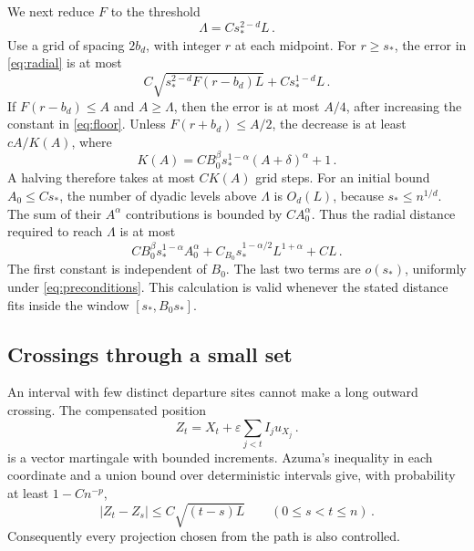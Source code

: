 \documentclass[11pt]{amsart}
\theoremstyle{plain}
\theoremstyle{definition}
\newcommand{\eps}{\varepsilon}
\begin{document}
We next reduce $F$ to the threshold
\begin{equation}\label{eq:floor}
\Lambda=Cs_*^{2-d}L\, .
\end{equation}
Use a grid of spacing $2b_d$, with integer $r$ at each midpoint.
For $r\geq s_*$, the error in \eqref{eq:radial} is at most
\begin{equation}\label{eq:halving-error}
C\sqrt{s_*^{2-d}F(r-b_d)L}+Cs_*^{1-d}L\, .
\end{equation}
If $F(r-b_d)\leq A$ and $A\geq\Lambda$, then the error is at most
$A/4$, after increasing the constant in \eqref{eq:floor}.
Unless $F(r+b_d)\leq A/2$, the decrease is at least $cA/K(A)$,
where
\begin{equation}\label{eq:halving-K}
K(A)=CB_0^\beta s_*^{1-\alpha}(A+\delta)^\alpha+1\, .
\end{equation}
A halving therefore takes at most $CK(A)$ grid steps.
For an initial bound $A_0\leq Cs_*$, the number of dyadic levels
above $\Lambda$ is $O_d(L)$, because $s_*\leq n^{1/d}$.
The sum of their $A^\alpha$ contributions is bounded by
$CA_0^\alpha$. Thus the radial distance required to reach $\Lambda$
is at most
\begin{equation}\label{eq:halving-cost}
CB_0^\beta s_*^{1-\alpha}A_0^\alpha
+C_{B_0}s_*^{1-\alpha/2}L^{1+\alpha}+CL\, .
\end{equation}
The first constant is independent of $B_0$.
The last two terms are $o(s_*)$, uniformly under \eqref{eq:preconditions}.
This calculation is valid whenever the stated distance fits inside
the window $[s_*,B_0s_*]$.

\subsection{Crossings through a small set}
An interval with few distinct departure sites cannot make a long
outward crossing.
The compensated position
\begin{equation}\label{eq:vector-def}
Z_t=X_t+\eps\sum_{j<t}I_ju_{X_j}\, .
\end{equation}
is a vector martingale with bounded increments.
Azuma's inequality in each coordinate and a union bound over deterministic
intervals give, with probability at least $1-Cn^{-p}$,
\begin{equation}\label{eq:vector}
|Z_t-Z_s|\leq C\sqrt{(t-s)L}
\qquad(0\leq s<t\leq n)\, .
\end{equation}
Consequently every projection chosen from the path is also controlled.
\end{document}

